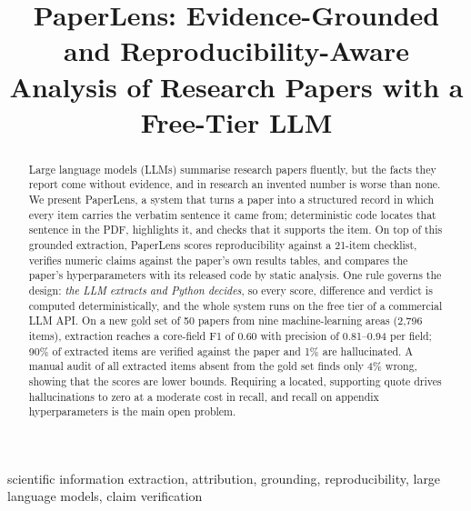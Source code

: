 \documentclass[conference]{IEEEtran}
\begin{document}
\title{PaperLens: Evidence-Grounded and Reproducibility-Aware Analysis of Research Papers with a Free-Tier LLM}

\author{
}

\maketitle

\begin{abstract}
Large language models (LLMs) summarise research papers fluently, but the facts they report
come without evidence, and in research an invented number is worse than none. We present
PaperLens, a system that turns a paper into a structured record in which every item carries
the verbatim sentence it came from; deterministic code locates that sentence in the PDF,
highlights it, and checks that it supports the item. On top of this grounded extraction,
PaperLens scores reproducibility against a 21-item checklist, verifies numeric claims
against the paper's own results tables, and compares the paper's hyperparameters with its
released code by static analysis. One rule governs the design: \emph{the LLM extracts and
Python decides}, so every score, difference and verdict is computed deterministically,
and the whole system runs on the free tier of a commercial LLM API. On a new gold set of
50 papers from nine machine-learning areas (2{,}796 items), extraction reaches a core-field
F1 of 0.60 with precision of 0.81--0.94 per field; 90\% of extracted items are verified
against the paper and 1\% are hallucinated. A manual audit of all extracted items absent
from the gold set finds only 4\% wrong, showing that the scores are lower bounds. Requiring
a located, supporting quote drives hallucinations to zero at a moderate cost in recall,
and recall on appendix hyperparameters is the main open problem.
\end{abstract}

\begin{IEEEkeywords}
scientific information extraction, attribution, grounding, reproducibility, large language
models, claim verification
\end{IEEEkeywords}
\end{document}
